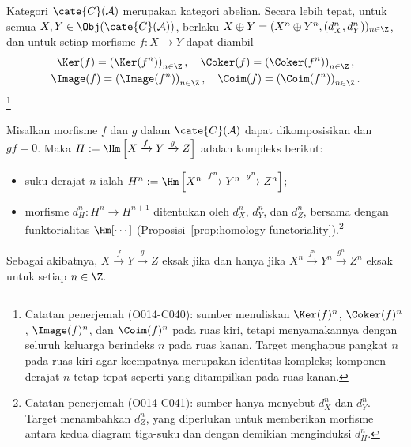 \begin{proposisi}\label{prop:abelian-cat-cplx}
	Kategori $\cate{C}(\mathcal{A})$ merupakan kategori abelian. Secara lebih
	tepat, untuk semua $X,Y\in\Obj(\cate{C}(\mathcal{A}))$, berlaku
	$X \oplus Y = (X^n \oplus Y^n, (d_X^n, d_Y^n))_{n \in \Z}$, dan untuk
	setiap morfisme $f:X\to Y$ dapat diambil
	\begin{gather*}
		\Ker(f) = \left( \Ker(f^n) \right)_{n \in \Z}, \quad
		\Coker(f) = \left( \Coker(f^n) \right)_{n \in \Z}, \\
		\Image(f) = \left( \Image(f^n) \right)_{n \in \Z}, \quad
		\Coim(f) = \left( \Coim(f^n) \right)_{n \in \Z}.
	\end{gather*}%
	\footnote{Catatan penerjemah (O014-C040): sumber menuliskan
	$\Ker(f)^n$, $\Coker(f)^n$, $\Image(f)^n$, dan $\Coim(f)^n$ pada ruas
	kiri, tetapi menyamakannya dengan seluruh keluarga berindeks $n$ pada ruas
	kanan. Target menghapus pangkat $n$ pada ruas kiri agar keempatnya merupakan
	identitas kompleks; komponen derajat $n$ tetap tepat seperti yang
	ditampilkan pada ruas kanan.}

	Misalkan morfisme $f$ dan $g$ dalam $\cate{C}(\mathcal{A})$ dapat
	dikomposisikan dan $gf=0$. Maka
	$H:=\Hm\left[X\xrightarrow{f}Y\xrightarrow{g}Z\right]$ adalah kompleks
	berikut:
	\begin{itemize}
		\item suku derajat $n$ ialah
		$H^n:=\Hm\left[X^n\xrightarrow{f^n}Y^n\xrightarrow{g^n}Z^n\right]$;
		\item morfisme $d_H^n:H^n\to H^{n+1}$ ditentukan oleh $d_X^n$,
		$d_Y^n$, dan $d_Z^n$, bersama dengan funktorialitas $\Hm[\cdots]$
		(Proposisi~\ref{prop:homology-functoriality}).\footnote{Catatan
		penerjemah (O014-C041): sumber hanya menyebut $d_X^n$ dan $d_Y^n$.
		Target menambahkan $d_Z^n$, yang diperlukan untuk memberikan morfisme
		antara kedua diagram tiga-suku dan dengan demikian menginduksi $d_H^n$.}
	\end{itemize}
	Sebagai akibatnya, $X\xrightarrow{f}Y\xrightarrow{g}Z$ eksak jika dan
	hanya jika $X^n\xrightarrow{f^n}Y^n\xrightarrow{g^n}Z^n$ eksak untuk
	setiap $n\in\Z$.
\end{proposisi}

